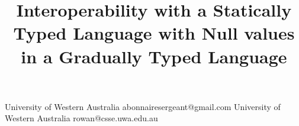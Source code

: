 \documentclass[preprint]{sigplanconf}
\begin{document}
\copyrightdata{[to be supplied]} 


\title{Interoperability with a Statically Typed Language with Null values in a Gradually Typed Language}

           {University of Western Australia}
           {abonnairesergeant@gmail.com}
           {University of Western Australia}
           {rowan@csse.uwa.edu.au}

\end{document}
